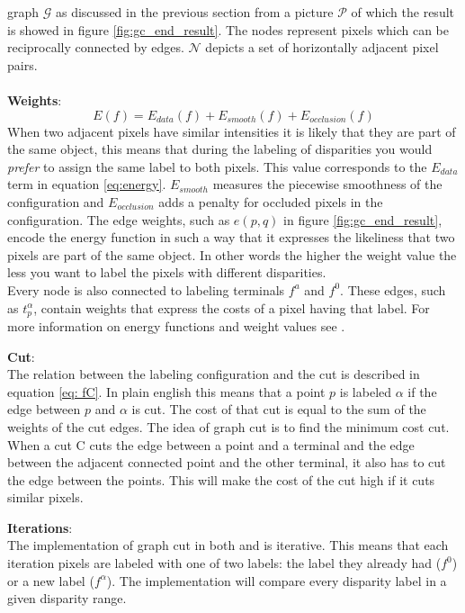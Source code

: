 \documentclass[a4paper]{article}
\begin{document}
graph $\mathcal{G}$ as discussed in the previous section from a
picture $\mathcal{P}$ of which the result is showed in figure \ref{fig:gc_end_result}.
The nodes represent pixels which can be reciprocally connected by edges.  $\mathcal{N}$ depicts a set of horizontally
adjacent pixel pairs.\\\\
\noindent\textbf{Weights}:\indent\\
\begin{equation}
 E(f) = E_{data}(f) + E_{smooth}(f) + E_{occlusion}(f)
\label{eq:energy}
\end{equation}
When two adjacent pixels have similar intensities it is likely that
they are part of the same object, this means that during the labeling
of disparities you would \emph{prefer} to assign the same label to
both pixels. This value corresponds to the $E_{data}$ term in equation \ref{eq:energy}.
$E_{smooth}$ measures the piecewise smoothness of the configuration and $E_{occlusion}$ 
adds a penalty for occluded pixels in the configuration.
The edge weights, such as $e(p,q)$ in figure \ref{fig:gc_end_result}, encode the energy function in such a way that it expresses
the likeliness that two pixels are part of the same object. In other words the higher the weight value 
the less you want to label the pixels with different disparities.\\
Every node is also connected to labeling terminals $f^a$ and $f^0$. These edges, such as $t^{\alpha}_{p}$, contain weights that 
express the costs of a pixel having that label. For more information on energy functions and weight values see \cite{zabih2001}.

\noindent\textbf{Cut}:\indent\\
The relation between the labeling configuration and the cut is described in equation \ref{eq: fC}. In plain english 
this means that a point $p$ is labeled $\alpha$ if the edge between $p$ and $\alpha$ is cut. The cost of that cut is equal 
to the sum of the weights of the cut edges. The idea of graph cut is to find the minimum cost cut. When a cut C cuts the 
edge between a point and a terminal and the edge between the adjacent connected point and the other terminal, it also has to
cut the edge between the points. This will make the cost of the cut high if it cuts similar pixels.

\noindent\textbf{Iterations}:\indent\\
The implementation of graph cut in both \cite{zabih2001} and \cite{kolmogorov2003} is iterative. This means that each iteration 
pixels are labeled with one of two labels: the label they already had ($f^0$) or a new label ($f^{\alpha}$). The implementation 
will compare every disparity label in a given disparity range.\\\\
\end{document}
